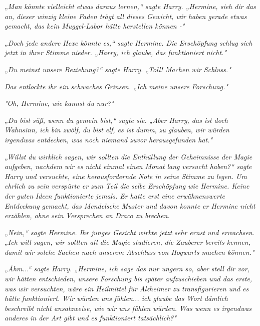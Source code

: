 {\emph{„Man} \emph{könnte vielleicht} \emph{\emph{etwas}} \emph{daraus lernen,“ sagte Harry. „Hermine, sieh dir das} \emph{\emph{an,}} \emph{dieser winzig kleine Faden trägt all dieses Gewicht, wir haben gerade etwas gemacht, das kein Muggel-Labor hätte herstellen können -"}

\emph{„Doch jede andere Hexe könnte es,“ sagte Hermine. Die Erschöpfung schlug sich jetzt in ihrer Stimme nieder. „Harry, ich glaube, das funktioniert nicht."}

\emph{„Du meinst unsere Beziehung?“ sagte Harry. „Toll! Machen wir Schluss."}

\emph{Das entlockte ihr ein schwaches Grinsen. „Ich meine unsere Forschung."}

\emph{"Oh, Hermine, wie} \emph{\emph{kannst}} \emph{du nur?"}

\emph{„Du bist süß, wenn du gemein bist,“ sagte sie. „Aber Harry, das ist doch Wahnsinn, ich bin zwölf, du bist elf, es ist} \emph{\emph{dumm,}} \emph{zu glauben, wir würden irgendwas entdecken, was noch niemand zuvor herausgefunden hat."}

\emph{„Willst du wirklich sagen, wir sollten die Enthüllung der Geheimnisse der Magie aufgeben, nachdem wir es nicht einmal einen} \emph{\emph{Monat}} \emph{lang versucht haben?“ sagte Harry und versuchte, eine herausfordernde Note in seine Stimme zu legen. Um ehrlich zu sein verspürte er zum Teil die selbe Erschöpfung wie Hermine. Keine der} \emph{\emph{guten}} \emph{Ideen funktionierte jemals. Er hatte erst eine erwähnenswerte Entdeckung gemacht, das Mendelsche Muster und davon konnte er Hermine nicht erzählen, ohne sein Versprechen an Draco zu brechen.}

\emph{„Nein,“ sagte Hermine. Ihr junges Gesicht wirkte} \emph{jetzt} \emph{sehr ernst und erwachsen. „Ich will sagen, wir sollten all die Magie} \emph{\emph{studieren,}} \emph{die Zauberer bereits kennen, damit wir solche Sachen nach unserem Abschluss von Hogwarts machen können."}

\emph{„Ähm...“ sagte Harry. „Hermine, ich sage das nur ungern so, aber stell dir vor, wir hätten entschieden, unsere Forschung bis später aufzuschieben und das erste, was wir versuchten, wäre ein Heilmittel für Alzheimer zu transfigurieren und es hätte} \emph{\emph{funktioniert.}} \emph{Wir würden uns fühlen... ich glaube das Wort} \emph{\emph{dämlich}} \emph{beschreibt nicht ansatzweise, wie wir uns fühlen würden. Was wenn es irgendwas anderes in der Art gibt und es funktioniert tatsächlich?"}

}
